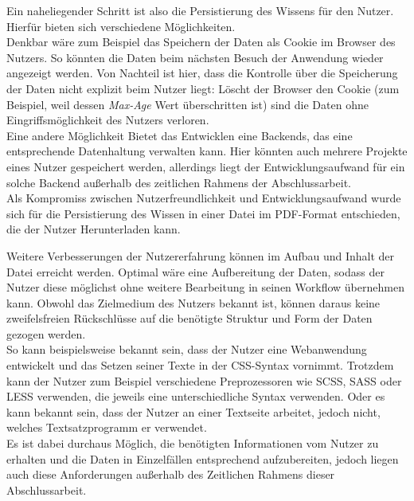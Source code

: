 Ein naheliegender Schritt ist also die Persistierung des Wissens für den Nutzer. Hierfür bieten sich verschiedene Möglichkeiten. \\
Denkbar wäre zum Beispiel das Speichern der Daten als Cookie\footnotemark{} im Browser des Nutzers. So könnten die Daten beim nächsten Besuch der Anwendung wieder angezeigt werden.
Von Nachteil ist hier, dass die Kontrolle über die Speicherung der Daten nicht explizit beim Nutzer liegt: Löscht der Browser den Cookie (zum Beispiel, weil dessen \textit{Max-Age}\footnotemark{} Wert überschritten ist) sind die Daten ohne Eingriffsmöglichkeit des Nutzers verloren.\\
Eine andere Möglichkeit Bietet das Entwicklen eine Backends, das eine entsprechende Datenhaltung verwalten kann. Hier könnten auch mehrere Projekte eines Nutzer gespeichert werden, allerdings liegt der Entwicklungsaufwand für ein solche Backend außerhalb des zeitlichen Rahmens der Abschlussarbeit. \\
Als Kompromiss zwischen Nutzerfreundlichkeit und Entwicklungsaufwand wurde sich für die Persistierung des Wissen in einer Datei im PDF-Format entschieden, die der Nutzer Herunterladen kann.


Weitere Verbesserungen der Nutzererfahrung können im Aufbau und Inhalt der Datei erreicht werden. Optimal wäre eine Aufbereitung der Daten, sodass der Nutzer diese möglichst ohne weitere Bearbeitung in seinen Workflow übernehmen kann. Obwohl das Zielmedium des Nutzers bekannt ist, können daraus keine zweifelsfreien Rückschlüsse auf die benötigte Struktur und Form der Daten gezogen werden. \\
So kann beispielsweise bekannt sein, dass der Nutzer eine Webanwendung entwickelt und das Setzen seiner Texte in der CSS-Syntax vornimmt. Trotzdem kann der Nutzer zum Beispiel verschiedene Preprozessoren wie SCSS, SASS oder LESS verwenden, die jeweils eine unterschiedliche Syntax verwenden.
Oder es kann bekannt sein, dass der Nutzer an einer Textseite arbeitet, jedoch nicht, welches Textsatzprogramm er verwendet\footnotemark{}.\\
Es ist dabei durchaus Möglich, die benötigten Informationen vom Nutzer zu erhalten und die Daten in Einzelfällen entsprechend aufzubereiten, jedoch liegen auch diese Anforderungen außerhalb des Zeitlichen Rahmens dieser Abschlussarbeit.
